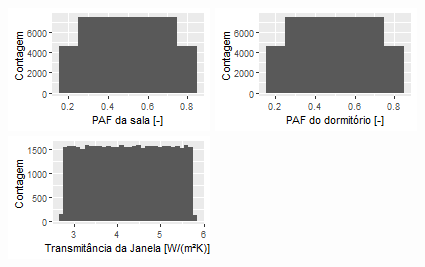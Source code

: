 \documentclass{article}
\begin{document}
\begin{figure}[h!]
\begin{minipage}{.33\textwidth}
	\end{minipage}
	\centering
	\begin{minipage}{.33\textwidth}
		\centering
		\includegraphics[width=\linewidth]{plot_wwr_living.png}
	\end{minipage}%
	\begin{minipage}{.33\textwidth}
		\centering
		\includegraphics[width=\linewidth]{plot_wwr_bedroom.png}
	\end{minipage}%
	\begin{minipage}{.33\textwidth}
		\centering
		\includegraphics[width=\linewidth]{plot_window_u.png}

\end{minipage}
\end{figure}
\end{document}
